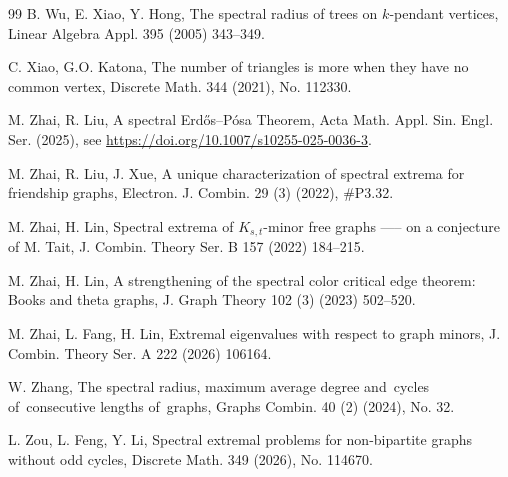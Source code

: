 \documentclass[11pt]{article}
\begin{document}
\begin{thebibliography}{99}
B. Wu, E. Xiao, Y. Hong,
The spectral radius of trees on $k$-pendant vertices,
Linear Algebra Appl. 395 (2005) 343--349.

C. Xiao, G.O. Katona, 
 The number of triangles is more when they have no 
 common vertex, Discrete Math. 344 (2021), No. 112330. 


M. Zhai, R. Liu, A spectral Erd\H{o}s--P\'{o}sa Theorem, 
Acta Math. Appl. Sin. Engl. Ser. (2025), see \url{https://doi.org/10.1007/s10255-025-0036-3}.  


M. Zhai, R. Liu, J. Xue,
A unique characterization of spectral extrema for friendship graphs,
Electron. J. Combin. 29 (3) (2022), \#P3.32. 

M. Zhai, H. Lin,  
Spectral extrema of $K_{s,t}$-minor free 
graphs ----- on a conjecture of M. Tait, 
J. Combin. Theory Ser. B 157 (2022) 184--215. 

M. Zhai, H. Lin,
A strengthening of the spectral color critical edge
theorem: Books and theta graphs,
J. Graph Theory 102 (3) (2023) 502--520. 


M. Zhai, L. Fang, H. Lin, 
Extremal eigenvalues with respect to graph
minors, J. Combin. Theory Ser. A  222 (2026) 106164.  


W. Zhang, 
The spectral radius, maximum average degree and cycles 
of consecutive lengths of graphs, 
Graphs Combin. 40 (2) (2024), No. 32.

L. Zou, L. Feng, Y. Li,
Spectral extremal problems for non-bipartite graphs without
odd cycles, Discrete Math. 349 (2026), No. 114670.

\end{thebibliography}
\end{document}
